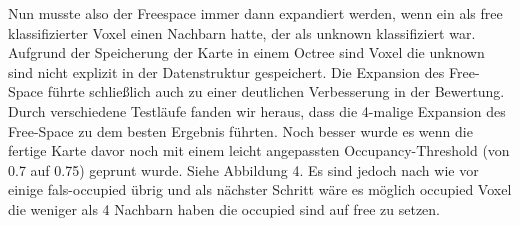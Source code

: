 \documentclass[12pt,titlepage, a4paper]{article}
\begin{document}
Nun musste also der Freespace immer dann expandiert werden, wenn ein als free klassifizierter Voxel einen Nachbarn hatte, der als unknown klassifiziert war. Aufgrund der Speicherung der Karte in einem Octree sind Voxel die unknown sind nicht explizit in der Datenstruktur gespeichert. Die Expansion des Free-Space führte schließlich auch zu einer deutlichen Verbesserung in der Bewertung. Durch verschiedene Testläufe fanden wir heraus, dass die 4-malige Expansion des Free-Space zu dem besten Ergebnis führten. Noch besser wurde es wenn die fertige Karte davor noch mit einem leicht angepassten Occupancy-Threshold (von 0.7 auf 0.75) geprunt wurde. Siehe Abbildung 4. Es sind jedoch nach wie vor einige fals-occupied übrig und als nächster Schritt wäre es möglich occupied Voxel die weniger als 4 Nachbarn haben die occupied sind auf free zu setzen.
\end{document}
